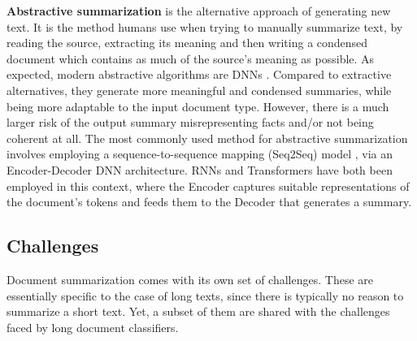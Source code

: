 \documentclass[preprint,review,10pt]{elsarticle}
\begin{document}
	\textbf{Abstractive summarization} is the alternative approach of generating new text. It is the method humans use when trying to manually summarize text, by reading the source, extracting its meaning and then writing a condensed document which contains as much of the source's meaning as possible. As expected, modern abstractive algorithms are DNNs \cite{cho}. Compared to extractive alternatives, they generate more meaningful and condensed summaries, while being more adaptable to the input document type. However, there is a much larger risk of the output summary misrepresenting facts and/or not being coherent at all. The most commonly used method for abstractive summarization involves employing a sequence-to-sequence mapping (Seq2Seq) model \cite{seq2seq}, via an Encoder-Decoder DNN architecture. RNNs and Transformers have both been employed in this context, where the Encoder captures suitable representations of the document's tokens and feeds them to the Decoder that generates a summary.
	
	\subsection{Challenges}
	\label{ssec::SummarizationChallenges}
	Document summarization comes with its own set of challenges. These are essentially specific to the case of long texts, since there is typically no reason to summarize a short text. Yet, a subset of them are shared with the challenges faced by long document classifiers.
	
\end{document}
